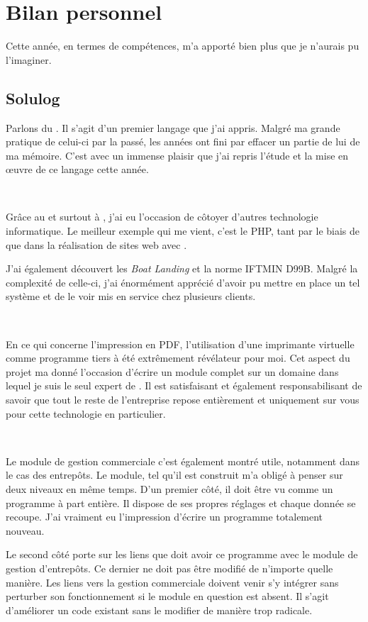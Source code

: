 \chapter{Bilan personnel}
Cette année, en termes de compétences, m'a apporté bien plus que je n'aurais pu l'imaginer.

\section{Solulog}
Parlons du \vb. Il s'agit d'un premier langage que j'ai appris. Malgré ma grande pratique de celui-ci par la passé, les années ont fini par effacer un partie de lui de ma mémoire. C'est avec un immense plaisir que j'ai repris l'étude et la mise en œuvre de ce langage cette année.

~

Grâce au \vb{} et surtout à \integrale, j'ai eu l'occasion de côtoyer d'autres technologie informatique. Le meilleur exemple qui me vient, c'est le PHP, tant par le biais de \pireus{} que dans la réalisation de sites web avec \fidit.

J'ai également découvert les \emph{Boat Landing} et la norme IFTMIN D99B. Malgré la complexité de celle-ci, j'ai énormément apprécié d'avoir pu mettre en place un tel système et de le voir mis en service chez plusieurs clients.

~

En ce qui concerne l'impression en PDF, l'utilisation d'une imprimante virtuelle comme programme tiers à été extrêmement révélateur pour moi. Cet aspect du projet ma donné l'occasion d'écrire un module complet sur un domaine dans lequel je suis le seul expert de \solulog. Il est satisfaisant et également responsabilisant de savoir que tout le reste de l'entreprise repose entièrement et uniquement sur vous pour cette technologie en particulier.

~

Le module de gestion commerciale c'est également montré utile, notamment dans le cas des entrepôts. Le module, tel qu'il est construit m'a obligé à penser sur deux niveaux en même temps. D'un premier côté, il doit être vu comme un programme à part entière. Il dispose de ses propres réglages et chaque donnée se recoupe. J'ai vraiment eu l'impression d'écrire un programme totalement nouveau.

Le second côté porte sur les liens que doit avoir ce programme avec le module de gestion d'entrepôts. Ce dernier ne doit pas être modifié de n'importe quelle manière. Les liens vers la gestion commerciale doivent venir s'y intégrer sans perturber son fonctionnement si le module en question est absent. Il s'agit d'améliorer un code existant sans le modifier de manière trop radicale.

